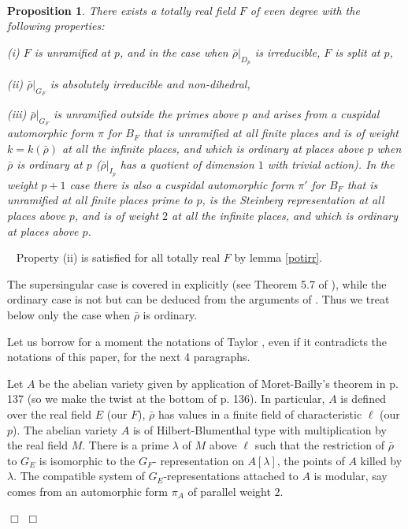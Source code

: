 \documentclass[12pt]{article}
\newcommand{\rhobar}{\overline{\rho}}
\newtheorem{prop}[theorem]{Proposition}
\newenvironment{proof}{\smallskip\noindent{\bf Proof.}\
}{$\Box$\smallskip\goodbreak}
\def\rhobar{ {\bar {\rho} } }
\def\rhob{ {\bar {\rho} } }
\begin{document}
\begin{proof}
\begin{prop}\label{taylor}
There exists a totally real field $F$ of even degree with the following
properties:

(i) $F$ is unramified at $p$, and in the case when $\rhob|_{D_p}$
is irreducible, $F$ is split at $p$,

(ii) $\rhobar|_{G_F}$ is absolutely irreducible and non-dihedral,

(iii) $\rhob|_{G_F}$ is unramified
outside the primes above $p$ and arises from
a cuspidal automorphic form $\pi$ for $B_F$ that is unramified at all
finite places and is of weight $k=k(\rhobar)$ at all the infinite
places, and which is ordinary at places above $p$ when $\rhob$ is ordinary
at $p$
($\rhob|_{I_p}$ has a quotient of dimension $1$ with trivial
action).
In the weight $p+1$ case there is also a cuspidal automorphic form
$\pi'$ for $B_F$ that is unramified at all
finite places prime to $p$, is the Steinberg representation at all
places above $p$, and is of weight $2$ at all the infinite
places, and which is ordinary at places above $p$.
\end{prop}

\begin{proof}
Property (ii) is satisfied for all totally real $F$ by lemma
\ref{potirr}.

The supersingular case is covered in
\cite{[T03]}
explicitly (see Theorem 5.7 of
\cite{[T03]}), while the ordinary case is not but can be deduced from the
arguments of \cite{[T02]}.
Thus we treat below only the case when $\rhob$ is ordinary.


Let us borrow for a moment the
notations of Taylor \cite{[T02]}, even if it contradicts the notations
of this paper,
for the next 4 paragraphs.

Let $A$ be the  abelian variety given by application
of Moret-Bailly's theorem in \cite{[T02]} p. 137
(so we make the twist at the bottom of p. 136).
In particular, $A$ is defined over the
real field $E$ (our $F$), $\rhob$ has values in a finite field
of characteristic $\ell$ (our $p$). The
abelian variety $A$ is of
Hilbert-Blumenthal type with multiplication by the real field $M$.
There is a prime $\lambda$ of $M$ above $\ell$ such that the
restriction of $\rhob$ to $G_E$ is  isomorphic to the $G_F$-
representation on  $A[\lambda]$, the points of $A$ killed
by $\lambda$. The compatible system of $G_E$-representations
attached to $A$ is modular, say comes from an
automorphic form
$\pi _A$ of parallel weight $2$.


\end{proof}
\end{proof}
\end{document}
